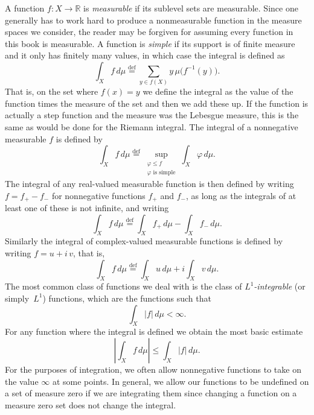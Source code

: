 \documentclass[12pt,openany]{book}
\newcommand{\sabs}[1]{\lvert {#1} \rvert}
\newcommand{\abs}[1]{\left\lvert {#1} \right\rvert}
\newcommand{\R}{{\mathbb{R}}}
\newcommand{\myindex}[1]{#1\index{#1}}
\theoremstyle{plain}
\theoremstyle{remark}
\theoremstyle{definition}
\theoremstyle{exercise}
\theoremstyle{example}
\begin{document}
A function $f \colon X \to \R$ is
\emph{measurable} if its sublevel
sets are measurable.
Since one generally has to work hard to produce a
\myindex{nonmeasurable function}
in the measure spaces we consider,
the reader may be forgiven for assuming every function in
this book is measurable.
A function is
\emph{simple}
if its support is of finite
measure and it only has finitely many values, in which case the integral is
defined as
\begin{equation*}
\int_X f\, d \mu
\overset{\text{def}}{=}
\sum_{y \in f(X)}
y \, \mu\bigl(f^{-1}(y)\bigr) .
\end{equation*}
That is, on the set where $f(x)=y$ we define the integral as the value of
the function times the measure of the set and then we add these up.
If the function is actually a step function and the measure was the Lebesgue
measure, this is the same as would be done for the Riemann integral.
The integral of a nonnegative measurable $f$ is defined by
\begin{equation*}
\int_X f\, d \mu
\overset{\text{def}}{=}
\sup_{\substack{\varphi \leq f \\ \varphi \text{ is simple}}}
\int_X \varphi \, d\mu .
\end{equation*}
The integral of any real-valued measurable function is
then defined by writing $f = f_+ - f_-$ for
nonnegative functions $f_+$ and $f_-$, as long as
the integrals of at least one of these is not infinite, and writing
\begin{equation*}
\int_X f\, d \mu
\overset{\text{def}}{=}
\int_X f_+\, d \mu
-
\int_X f_-\, d \mu .
\end{equation*}
Similarly the integral of
complex-valued measurable functions is defined by writing $f = u + i \, v$,
that is,
\begin{equation*}
\int_X f\, d \mu
\overset{\text{def}}{=}
\int_X u\, d \mu
+
i
\int_X v\, d \mu .
\end{equation*}
The most common class of functions we deal with is the class of
\emph{$L^1$-integrable}
(or simply~$L^1$)
functions, which are the functions such that
\begin{equation*}
\int_X \sabs{f} \, d\mu < \infty .
\end{equation*}
For any function where the integral is defined we obtain
the most basic estimate
\begin{equation*}
\abs{\int_X f \, d\mu} \leq
\int_X \sabs{f} \, d\mu .
\end{equation*}
For the purposes of integration, we often allow nonnegative
functions to take on the value $\infty$ at some points.
In general, we allow our functions to
be undefined on a set of measure zero if we are integrating them since
changing a function on a measure zero set does not change the integral.
\end{document}

